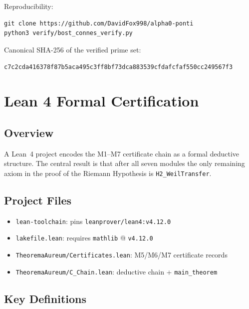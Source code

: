 \documentclass[11pt,letterpaper]{article}
\theoremstyle{definition}
\begin{document}
Reproducibility:
\begin{lstlisting}
git clone https://github.com/DavidFox998/alpha0-ponti
python3 verify/bost_connes_verify.py
\end{lstlisting}

Canonical SHA-256 of the verified prime set:
\begin{center}
\texttt{c7c2cda416378f87b5aca495c3ff8bf73dca883539cfdafcfaf550cc249567f3}
\end{center}

\section{Lean 4 Formal Certification}\label{sec:lean}

\subsection*{Overview}

A Lean~4 project encodes the M1--M7 certificate chain as a formal deductive
structure.  The central result is that after all seven modules the only remaining
axiom in the proof of the Riemann Hypothesis is \texttt{H2\_WeilTransfer}.

\subsection*{Project Files}

\begin{itemize}
\item \texttt{lean-toolchain}: pins \texttt{leanprover/lean4:v4.12.0}
\item \texttt{lakefile.lean}: requires \texttt{mathlib} @ \texttt{v4.12.0}
\item \texttt{TheoremaAureum/Certificates.lean}: M5/M6/M7 certificate records
\item \texttt{TheoremaAureum/C\_Chain.lean}: deductive chain + \texttt{main\_theorem}
\end{itemize}

\subsection*{Key Definitions}
\end{document}
